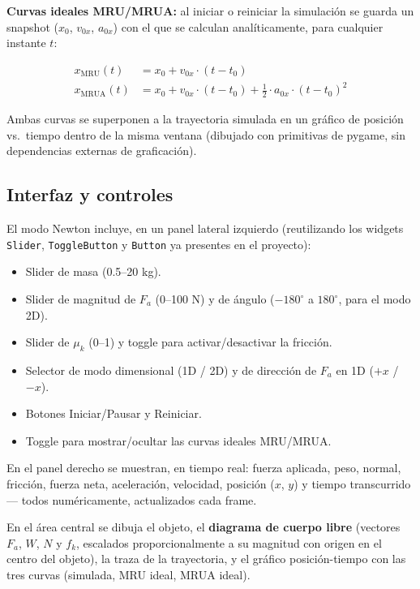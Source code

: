\documentclass[12pt,letterpaper]{article}
\begin{document}
\textbf{Curvas ideales MRU/MRUA:} al iniciar o reiniciar la simulación se guarda un snapshot ($x_0$, $v_{0x}$, $a_{0x}$) con el que se calculan analíticamente, para cualquier instante $t$:

\begin{align*}
x_{\text{MRU}}(t)  &= x_0 + v_{0x} \cdot (t - t_0) \\
x_{\text{MRUA}}(t) &= x_0 + v_{0x} \cdot (t - t_0) + \tfrac{1}{2} \cdot a_{0x} \cdot (t - t_0)^2
\end{align*}

Ambas curvas se superponen a la trayectoria simulada en un gráfico de posición vs.\ tiempo dentro de la misma ventana (dibujado con primitivas de pygame, sin dependencias externas de graficación).

\subsection{Interfaz y controles}

El modo Newton incluye, en un panel lateral izquierdo (reutilizando los widgets \texttt{Slider}, \texttt{ToggleButton} y \texttt{Button} ya presentes en el proyecto):

\begin{itemize}[leftmargin=1.5em]
  \item Slider de masa (0.5--20 kg).
  \item Slider de magnitud de $F_a$ (0--100 N) y de ángulo ($-180^\circ$ a $180^\circ$, para el modo 2D).
  \item Slider de $\mu_k$ (0--1) y toggle para activar/desactivar la fricción.
  \item Selector de modo dimensional (1D / 2D) y de dirección de $F_a$ en 1D ($+x$ / $-x$).
  \item Botones Iniciar/Pausar y Reiniciar.
  \item Toggle para mostrar/ocultar las curvas ideales MRU/MRUA.
\end{itemize}

En el panel derecho se muestran, en tiempo real: fuerza aplicada, peso, normal, fricción, fuerza neta, aceleración, velocidad, posición ($x$, $y$) y tiempo transcurrido --- todos numéricamente, actualizados cada frame.

En el área central se dibuja el objeto, el \textbf{diagrama de cuerpo libre} (vectores $F_a$, $W$, $N$ y $f_k$, escalados proporcionalmente a su magnitud con origen en el centro del objeto), la traza de la trayectoria, y el gráfico posición-tiempo con las tres curvas (simulada, MRU ideal, MRUA ideal).
\end{document}
